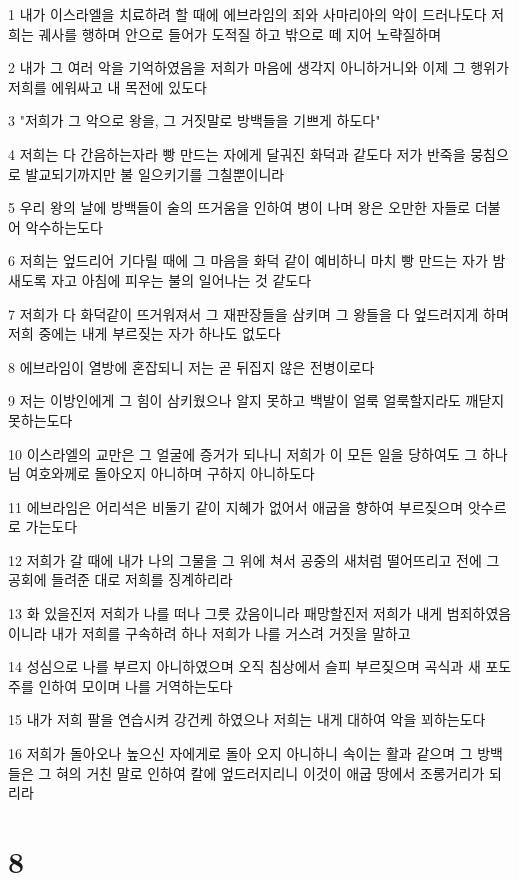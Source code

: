 \par 1 내가 이스라엘을 치료하려 할 때에 에브라임의 죄와 사마리아의 악이 드러나도다 저희는 궤사를 행하며 안으로 들어가 도적질 하고 밖으로 떼 지어 노략질하며
\par 2 내가 그 여러 악을 기억하였음을 저희가 마음에 생각지 아니하거니와 이제 그 행위가 저희를 에워싸고 내 목전에 있도다
\par 3 "저희가 그 악으로 왕을, 그 거짓말로 방백들을 기쁘게 하도다"
\par 4 저희는 다 간음하는자라 빵 만드는 자에게 달궈진 화덕과 같도다 저가 반죽을 뭉침으로 발교되기까지만 불 일으키기를 그칠뿐이니라
\par 5 우리 왕의 날에 방백들이 술의 뜨거움을 인하여 병이 나며 왕은 오만한 자들로 더불어 악수하는도다
\par 6 저희는 엎드리어 기다릴 때에 그 마음을 화덕 같이 예비하니 마치 빵 만드는 자가 밤새도록 자고 아침에 피우는 불의 일어나는 것 같도다
\par 7 저희가 다 화덕같이 뜨거워져서 그 재판장들을 삼키며 그 왕들을 다 엎드러지게 하며 저희 중에는 내게 부르짖는 자가 하나도 없도다
\par 8 에브라임이 열방에 혼잡되니 저는 곧 뒤집지 않은 전병이로다
\par 9 저는 이방인에게 그 힘이 삼키웠으나 알지 못하고 백발이 얼룩 얼룩할지라도 깨닫지 못하는도다
\par 10 이스라엘의 교만은 그 얼굴에 증거가 되나니 저희가 이 모든 일을 당하여도 그 하나님 여호와께로 돌아오지 아니하며 구하지 아니하도다
\par 11 에브라임은 어리석은 비둘기 같이 지혜가 없어서 애굽을 향하여 부르짖으며 앗수르로 가는도다
\par 12 저희가 갈 때에 내가 나의 그물을 그 위에 쳐서 공중의 새처럼 떨어뜨리고 전에 그 공회에 들려준 대로 저희를 징계하리라
\par 13 화 있을진저 저희가 나를 떠나 그릇 갔음이니라 패망할진저 저희가 내게 범죄하였음이니라 내가 저희를 구속하려 하나 저희가 나를 거스려 거짓을 말하고
\par 14 성심으로 나를 부르지 아니하였으며 오직 침상에서 슬피 부르짖으며 곡식과 새 포도주를 인하여 모이며 나를 거역하는도다
\par 15 내가 저희 팔을 연습시켜 강건케 하였으나 저희는 내게 대하여 악을 꾀하는도다
\par 16 저희가 돌아오나 높으신 자에게로 돌아 오지 아니하니 속이는 활과 같으며 그 방백들은 그 혀의 거친 말로 인하여 칼에 엎드러지리니 이것이 애굽 땅에서 조롱거리가 되리라

\chapter{8}

